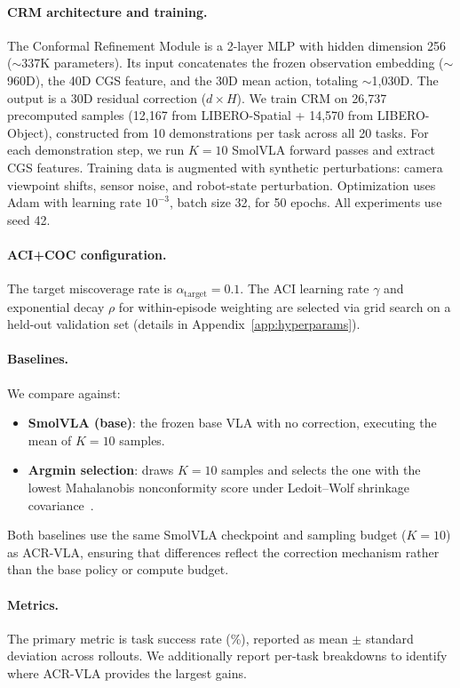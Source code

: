 \paragraph{CRM architecture and training.}
The Conformal Refinement Module is a 2-layer MLP with hidden dimension 256 (${\sim}$337K parameters).
Its input concatenates the frozen observation embedding (${\sim}$960D), the 40D CGS feature, and the 30D mean action, totaling ${\sim}$1{,}030D.
The output is a 30D residual correction ($d{\times}H$).
We train CRM on 26{,}737 precomputed samples (12{,}167 from LIBERO-Spatial + 14{,}570 from LIBERO-Object), constructed from 10 demonstrations per task across all 20 tasks.
For each demonstration step, we run $K{=}10$ SmolVLA forward passes and extract CGS features.
Training data is augmented with synthetic perturbations: camera viewpoint shifts, sensor noise, and robot-state perturbation.
Optimization uses Adam with learning rate $10^{-3}$, batch size 32, for 50 epochs.
All experiments use seed 42.

\paragraph{ACI+COC configuration.}
The target miscoverage rate is $\alpha_{\mathrm{target}}{=}0.1$.
The ACI learning rate $\gamma$ and exponential decay $\rho$ for within-episode weighting are selected via grid search on a held-out validation set (details in Appendix~\ref{app:hyperparams}).

\paragraph{Baselines.}
We compare against:
\begin{itemize}[nosep]
  \item \textbf{SmolVLA (base)}: the frozen base VLA with no correction, executing the mean of $K{=}10$ samples.
  \item \textbf{Argmin selection}: draws $K{=}10$ samples and selects the one with the lowest Mahalanobis nonconformity score under Ledoit--Wolf shrinkage covariance~\cite{braun2025cgs}.
\end{itemize}
Both baselines use the same SmolVLA checkpoint and sampling budget ($K{=}10$) as ACR-VLA, ensuring that differences reflect the correction mechanism rather than the base policy or compute budget.

\paragraph{Metrics.}
The primary metric is task success rate (\%), reported as mean $\pm$ standard deviation across rollouts.
We additionally report per-task breakdowns to identify where ACR-VLA provides the largest gains.


